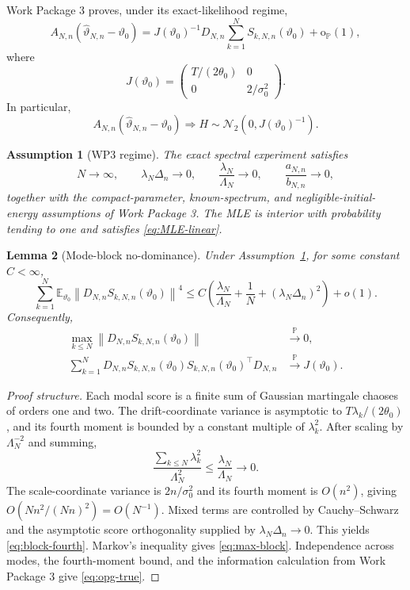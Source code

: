 \documentclass[11pt]{article}
\newtheorem{assumption}{Assumption}[section]
\newtheorem{lemma}[assumption]{Lemma}
\theoremstyle{remark}
\newcommand{\E}{\mathbb E}
\newcommand{\Pp}{\mathbb P}
\newcommand{\op}{\mathrm{o}_{\Pp}}
\newcommand{\norm}[1]{\left\lVert #1\right\rVert}
\newcommand{\an}{a_{N,n}}
\newcommand{\bn}{b_{N,n}}
\newcommand{\LamN}{\Lambda_N}
\newcommand{\vhat}{\widehat\vartheta_{N,n}}
\newcommand{\vzero}{\vartheta_0}
\newcommand{\Dmat}{D_{N,n}}
\newcommand{\Amat}{A_{N,n}}
\begin{document}
Work Package 3 proves, under its exact-likelihood regime,
\begin{equation}\label{eq:MLE-linear}
 \Amat(\vhat-\vzero)
 =
 J(\vzero)^{-1}
 \Dmat\sum_{k=1}^N S_{k,N,n}(\vzero)
 +\op(1),
\end{equation}
where
\begin{equation}\label{eq:J}
 J(\vzero)
 =
 \begin{pmatrix}
 T/(2\theta_0)&0\\
 0&2/\sigma_0^2
 \end{pmatrix}.
\end{equation}
In particular,
\begin{equation}\label{eq:mixed-limit}
 \Amat(\vhat-\vzero)
 \Rightarrow
 H\sim\mathcal N_2(0,J(\vzero)^{-1}).
\end{equation}

\begin{assumption}[WP3 regime]\label{ass:wp3}
The exact spectral experiment satisfies
\[
 N\to\infty,
 \qquad
 \lambda_N\Delta_n\to0,
 \qquad
 \frac{\lambda_N}{\LamN}\to0,
 \qquad
 \frac{\an}{\bn}\to0,
\]
together with the compact-parameter, known-spectrum, and negligible-initial-energy assumptions of Work Package 3. The MLE is interior with probability tending to one and satisfies \eqref{eq:MLE-linear}.
\end{assumption}

\begin{lemma}[Mode-block no-dominance]\label{lem:block}
Under Assumption~\ref{ass:wp3}, for some constant $C<\infty$,
\begin{equation}\label{eq:block-fourth}
 \sum_{k=1}^N
 \E_{\vzero}
 \norm{\Dmat S_{k,N,n}(\vzero)}^4
 \le
 C\left(
 \frac{\lambda_N}{\LamN}
 +\frac1N
 +(\lambda_N\Delta_n)^2
 \right)
 +o(1).
\end{equation}
Consequently,
\begin{align}
 \max_{k\le N}
 \norm{\Dmat S_{k,N,n}(\vzero)}
 &\overset{\Pp}{\longrightarrow}0,\label{eq:max-block}\\
 \sum_{k=1}^N
 \Dmat S_{k,N,n}(\vzero)
 S_{k,N,n}(\vzero)^\top\Dmat
 &\overset{\Pp}{\longrightarrow}J(\vzero).\label{eq:opg-true}
\end{align}
\end{lemma}

\begin{proof}[Proof structure]
Each modal score is a finite sum of Gaussian martingale chaoses of orders one and two. The drift-coordinate variance is asymptotic to $T\lambda_k/(2\theta_0)$, and its fourth moment is bounded by a constant multiple of $\lambda_k^2$. After scaling by $\LamN^{-2}$ and summing,
\[
 \frac{\sum_{k\le N}\lambda_k^2}{\LamN^2}
 \le
 \frac{\lambda_N}{\LamN}\to0.
\]
The scale-coordinate variance is $2n/\sigma_0^2$ and its fourth moment is $O(n^2)$, giving $O(Nn^2/(Nn)^2)=O(N^{-1})$. Mixed terms are controlled by Cauchy--Schwarz and the asymptotic score orthogonality supplied by $\lambda_N\Delta_n\to0$. This yields \eqref{eq:block-fourth}. Markov's inequality gives \eqref{eq:max-block}. Independence across modes, the fourth-moment bound, and the information calculation from Work Package 3 give \eqref{eq:opg-true}.
\end{proof}
\end{document}
